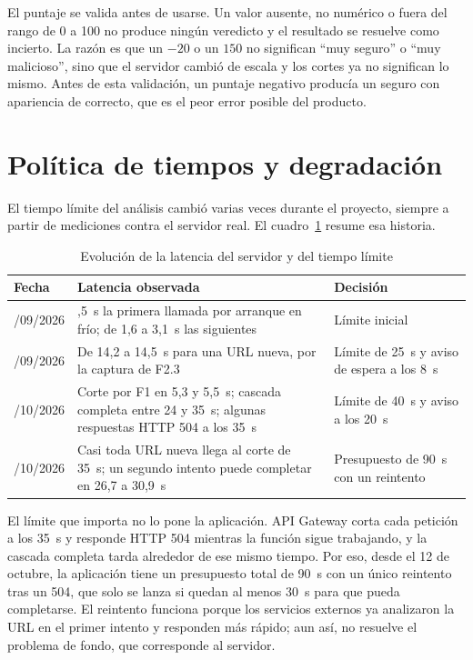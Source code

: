 El puntaje se valida antes de usarse. Un valor ausente, no numérico o fuera del rango de 0 a 100 no produce ningún veredicto y el resultado se resuelve como incierto. La razón es que un $-20$ o un $150$ no significan ``muy seguro'' o ``muy malicioso'', sino que el servidor cambió de escala y los cortes ya no significan lo mismo. Antes de esta validación, un puntaje negativo producía un seguro con apariencia de correcto, que es el peor error posible del producto.

\section{Política de tiempos y degradación}

El tiempo límite del análisis cambió varias veces durante el proyecto, siempre a partir de mediciones contra el servidor real. El cuadro~\ref{tab:latencias} resume esa historia.

\begin{table}[H]
	\centering
	\caption{Evolución de la latencia del servidor y del tiempo límite}
	\label{tab:latencias}
	\small
	\begin{tabular}{@{}>{\raggedright\arraybackslash}p{2.2cm}>{\raggedright\arraybackslash}p{6.2cm}>{\raggedright\arraybackslash}p{4.4cm}@{}}
		\toprule
		\textbf{Fecha} & \textbf{Latencia observada} & \textbf{Decisión} \\
		\midrule
		20/09/2026 & 5,5~s la primera llamada por arranque en frío; de 1,6 a 3,1~s las siguientes & Límite inicial \\
		30/09/2026 & De 14,2 a 14,5~s para una URL nueva, por la captura de F2.3 & Límite de 25~s y aviso de espera a los 8~s \\
		11/10/2026 & Corte por F1 en 5,3 y 5,5~s; cascada completa entre 24 y 35~s; algunas respuestas HTTP 504 a los 35~s & Límite de 40~s y aviso a los 20~s \\
		12/10/2026 & Casi toda URL nueva llega al corte de 35~s; un segundo intento puede completar en 26,7 a 30,9~s & Presupuesto de 90~s con un reintento \\
		\bottomrule
	\end{tabular}
\end{table}

El límite que importa no lo pone la aplicación. API Gateway corta cada petición a los 35~s y responde HTTP 504 mientras la función sigue trabajando, y la cascada completa tarda alrededor de ese mismo tiempo. Por eso, desde el 12 de octubre, la aplicación tiene un presupuesto total de 90~s con un único reintento tras un 504, que solo se lanza si quedan al menos 30~s para que pueda completarse. El reintento funciona porque los servicios externos ya analizaron la URL en el primer intento y responden más rápido; aun así, no resuelve el problema de fondo, que corresponde al servidor.

